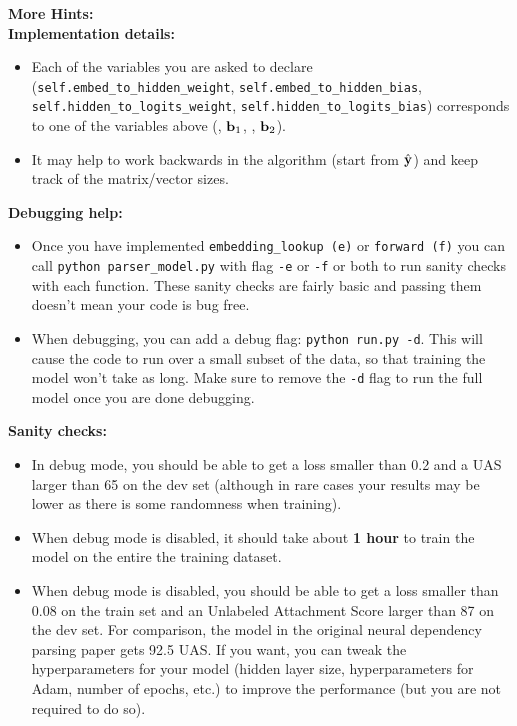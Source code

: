 \begin{parts}
    \textbf{More Hints:}\\
    \textbf{Implementation details:}
    \begin{itemize}
        \item Each of the variables you are asked to declare (\texttt{self.embed\_to\_hidden\_weight}, \newline \texttt{self.embed\_to\_hidden\_bias}, \texttt{self.hidden\_to\_logits\_weight}, \newline \texttt{self.hidden\_to\_logits\_bias}) corresponds to one of the variables above (\bW, $\mathbf{b}_1$, \bU, $\mathbf{b}_2$).
        \item It may help to work backwards in the algorithm (start from $\hat{\mathbf{y}}$) and keep track of the matrix/vector sizes.
    \end{itemize}
    \textbf{Debugging help:}
    \begin{itemize}
        \item Once you have implemented \texttt{embedding\_lookup (e)} or \texttt{forward (f)} you can call \texttt{python parser\_model.py} with flag \texttt{-e} or \texttt{-f} or both to run sanity checks with each function. These sanity checks are fairly basic and passing them doesn't mean your code is bug free.
        \item
        When debugging, you can add a debug flag: \texttt{python run.py -d}. This will cause the code to run over a small subset of the data, so that training the model won't take as long. Make sure to remove the \texttt{-d} flag to run the full model once you are done debugging.
    \end{itemize}
    \textbf{Sanity checks:}
    \begin{itemize}
        \item
        In debug mode, you should be able to get a loss smaller than 0.2 and a UAS larger than 65 on the dev set (although in rare cases your results may be lower as there is some randomness when training).

        \item When debug mode is disabled, it should take about \textbf{1 hour} to train the model on the entire the training dataset.

        \item When debug mode is disabled, you should be able to get a loss smaller than 0.08 on the train set and an Unlabeled Attachment Score larger than 87 on the dev set. For comparison, the model in the original neural dependency parsing paper gets 92.5 UAS. If you want, you can tweak the hyperparameters for your model (hidden layer size, hyperparameters for Adam, number of epochs, etc.) to improve the performance (but you are not required to do so).
    \end{itemize}


\end{parts}
